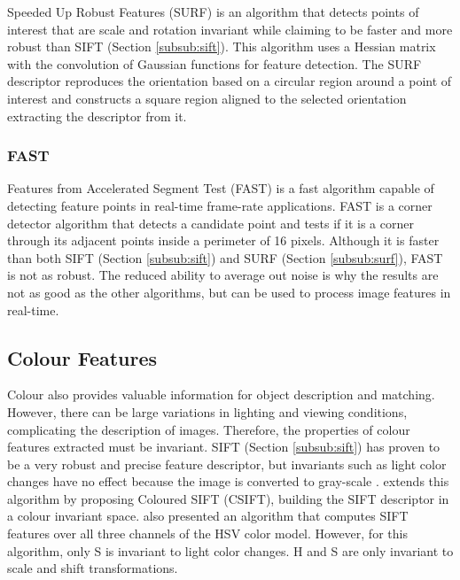 Speeded Up Robust Features (SURF) \cite{bay2006surf} is an algorithm that detects points of interest that are scale and rotation invariant while claiming to be faster and more robust than SIFT (Section \ref{subsub:sift}). This algorithm uses a Hessian matrix with the convolution of Gaussian functions for feature detection. The SURF descriptor reproduces the orientation based on a circular region around a point of interest and constructs a square region aligned to the selected orientation extracting the descriptor from it.

\subsubsection{FAST}
\label{subsub:fast}

Features from Accelerated Segment Test (FAST) \cite{rosten2006machine} is a fast algorithm capable of detecting feature points in real-time frame-rate applications. FAST is a corner detector algorithm that detects a candidate point and tests if it is a corner through its adjacent points inside a perimeter of 16 pixels. Although it is faster than both SIFT (Section \ref{subsub:sift}) and SURF (Section \ref{subsub:surf}), FAST is not as robust. The reduced ability to average out noise is why the results are not as good as the other algorithms, but can be used to process image features in real-time.

\subsection{Colour Features}

Colour also provides valuable information for object description and matching. However, there can be large variations in lighting and viewing conditions, complicating the description of images. Therefore, the properties of colour features extracted must be invariant.
SIFT (Section \ref{subsub:sift}) has proven to be a very robust and precise feature descriptor, but invariants such as light color changes have no effect because the image is converted to gray-scale \cite{van2008comparison}. \citeauthor{abdel2006csift} \cite{abdel2006csift} extends this algorithm by proposing Coloured SIFT (CSIFT), building the SIFT descriptor in a colour invariant space.
\citeauthor{bosch2007representing} \cite{bosch2007representing} also presented an algorithm that computes SIFT features over all three channels of the HSV color model. However, for this algorithm, only S is invariant to light color changes. H and S are only invariant to scale and shift transformations.

